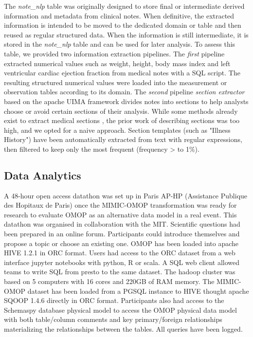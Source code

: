 The \textit{note\_nlp} table was originally designed to store final or intermediate 
derived information and metadata from clinical notes. When definitive, the 
extracted information is intended to be moved to the dedicated domain or table 
and then reused as regular structured data. 
When the information is still intermediate, it is stored in the \textit{note\_nlp} 
table and can be used for later analysis. 
To assess this table, we provided two information extraction pipelines. 
The \emph{first} pipeline extracted numerical values such as weight, height, 
body mass index and left ventricular cardiac ejection fraction from medical notes 
with a SQL script. The resulting structured numerical values were loaded into the 
measurement or observation tables according to its domain. 
The \emph{second} pipeline \emph{section extractor} based on the apache UIMA 
framework divides notes into sections to help analysts choose or avoid certain 
sections of their analysis. While some methods already exist to extract 
medical sections \cite{section-extraction}, the prior work of describing sections 
was too high, and we opted for a naive approach. Section templates (such as 
"Illness History") have been automatically extracted from text with regular 
expressions, then filtered to keep only the most frequent (frequency > to 1\%). 

%
%
\subsection{Data Analytics}

A 48-hour open access datathon \cite{mimic-omop-datathon} was set up in Paris AP-HP 
(Assistance Publique des Hopitaux de Paris) once the MIMIC-OMOP transformation was 
ready for research to evaluate OMOP as an alternative data model in a real event. 
This datathon was organised in collaboration with the MIT.
Scientific questions had been prepared in an online forum. Participants could 
introduce themselves and propose a topic or choose an existing one. 
OMOP has been loaded into apache HIVE 1.2.1 in ORC format. Users had access to 
the ORC dataset from a web interface jupyter notebooks with python, R or scala. 
A SQL web client allowed teams to write SQL from presto to the same dataset. 
The hadoop cluster was based on 5 computers with 16 cores and 220GB of RAM memory. 
The MIMIC-OMOP dataset has been loaded from a PGSQL instance to HIVE thought apache 
SQOOP 1.4.6 directly in ORC format. Participants also had access to the Schemaspy 
database physical model to access the OMOP physical data model with both 
table/column comments and key primary/foreign relationships materializing the 
relationships between the tables. All queries have been logged.

